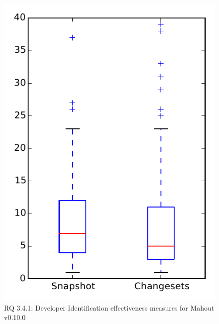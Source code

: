 
\begin{figure}
\centering
\includegraphics[height=0.4\textheight]{figures/dit/rq1_mahout}
\caption{RQ 3.4.1: Developer Identification effectiveness measures for Mahout v0.10.0}
\label{fig:dit:rq1:mahout}
\end{figure}
